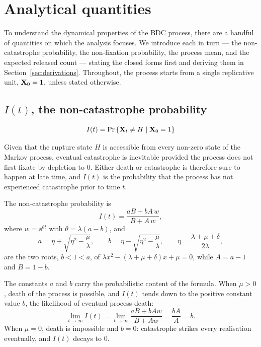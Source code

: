 \section{Analytical quantities}
\label{sec:analytical}

To understand the dynamical properties of the BDC process, there are a handful
of quantities on which the analysis focuses. We introduce each in turn --- the
non-catastrophe probability, the non-fixation probability, the process mean,
and the expected released count --- stating the closed forms first and deriving
them in Section~\ref{sec:derivations}. Throughout, the process starts from a
single replicative unit, ${\bf X}_0=1$, unless stated otherwise.

\subsection{$I(t)$, the non-catastrophe probability}

\vspace{3pt}
{\Large$$ I(t) = {\text{Pr}\left\{{{\bf X}_t} \neq H\;|\; {\bf X}_0 = 1\right\}}$$}

\noindent
Given that the rupture state $H$ is accessible from every non-zero state of the
Markov process, eventual catastrophe is inevitable provided the process does not
first fixate by depletion to $0$. Either death or catastrophe is therefore sure
to happen at late time, and $I(t)$ is the probability that the process has not
experienced catastrophe prior to time $t$.

\begin{theorem}
\label{thm:I}
The non-catastrophe probability is
\begin{equation}
\label{eq:Iclosedform}
I(t) = \frac{aB + bA\,w}{B + A\,w},
\end{equation}
where $w=\ee^{\theta t}$ with $\theta=\lambda(a-b)$, and
\begin{equation*}
a = \eta+\sqrt{\eta^2-\frac{\mu}{\lambda}}, \qquad
b = \eta-\sqrt{\eta^2-\frac{\mu}{\lambda}}, \qquad
\eta = \frac{\lambda + \mu + \delta}{2\lambda},
\end{equation*}
are the two roots, $b<1<a$, of $\lambda x^2-(\lambda+\mu+\delta)x+\mu=0$, while
$A=a-1$ and $B=1-b$.
\end{theorem}

The constants $a$ and $b$ carry the probabilistic content of the formula.
When $\mu>0$, death of the process is possible, and $I(t)$ tends down to the
positive constant value $b$, the likelihood of eventual process death:
$$\lim_{t\to \infty}I(t) = \lim_{t\to\infty}\frac{aB + bAw}{B + Aw} = \frac{bA}{A} = b.$$
When $\mu=0$, death is impossible and $b=0$: catastrophe strikes every
realisation eventually, and $I(t)$ decays to $0$.

